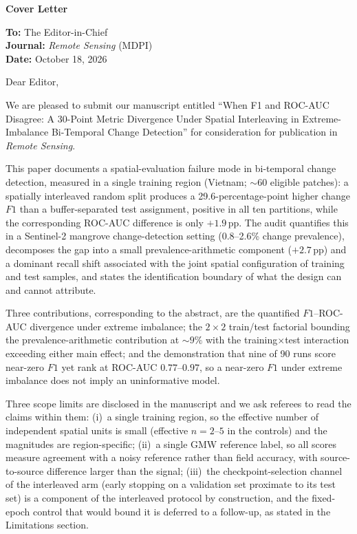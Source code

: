 \documentclass[11pt]{article}
\begin{document}
\begin{center}
{\large\bfseries Cover Letter}
\end{center}

\vspace{0.5cm}

\noindent\textbf{To:} The Editor-in-Chief\\
\noindent\textbf{Journal:} \emph{Remote Sensing} (MDPI)\\
\noindent\textbf{Date:} October 18, 2026

\vspace{0.5cm}

\noindent Dear Editor,

We are pleased to submit our manuscript entitled ``When F1 and ROC-AUC
Disagree: A 30-Point Metric Divergence Under Spatial Interleaving in
Extreme-Imbalance Bi-Temporal Change Detection'' for consideration for
publication in \emph{Remote Sensing}.

This paper documents a spatial-evaluation failure mode in bi-temporal change
detection, measured in a single training region (Vietnam; ${\sim}60$
eligible patches): a spatially interleaved random split produces a
29.6-percentage-point higher change $F1$ than a buffer-separated test
assignment, positive in all ten partitions, while the corresponding ROC-AUC
difference is only $+1.9$\,pp. The audit quantifies this in a Sentinel-2
mangrove change-detection setting (0.8--2.6\% change prevalence), decomposes
the gap into a small prevalence-arithmetic component ($+2.7$\,pp) and a
dominant recall shift associated with the joint spatial configuration of
training and test samples, and states the identification boundary of what the
design can and cannot attribute.

Three contributions, corresponding to the abstract, are the quantified
$F1$--ROC-AUC divergence under extreme imbalance; the $2\times2$
train/test factorial bounding the prevalence-arithmetic contribution at
${\sim}9\%$ with the training$\times$test interaction exceeding either main
effect; and the demonstration that nine of 90 runs score near-zero $F1$ yet
rank at ROC-AUC $0.77$--$0.97$, so a near-zero $F1$ under extreme imbalance
does not imply an uninformative model.

Three scope limits are disclosed in the manuscript and we ask referees to
read the claims within them: (i)~a single training region, so the effective
number of independent spatial units is small (effective $n{=}2$--$5$ in the
controls) and the magnitudes are region-specific; (ii)~a single GMW reference
label, so all scores measure agreement with a noisy reference rather than field
accuracy, with source-to-source difference larger than the signal;
(iii)~the checkpoint-selection channel of the interleaved arm (early stopping
on a validation set proximate to its test set) is a component of the
interleaved protocol by construction, and the fixed-epoch control that would
bound it is deferred to a follow-up, as stated in the Limitations section.
\end{document}

